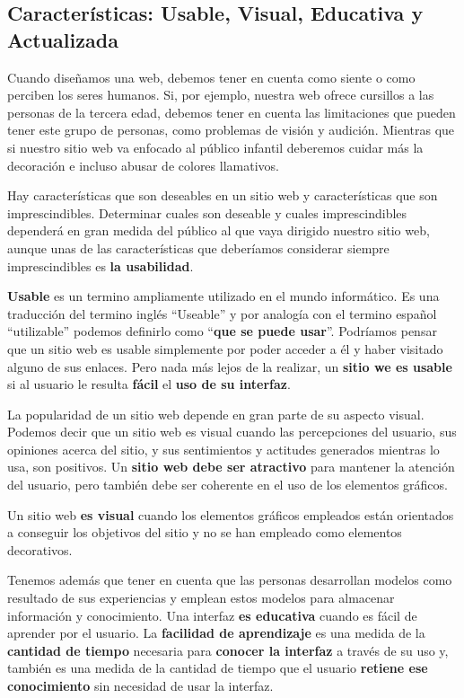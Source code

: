 \subsection{Características: Usable, Visual, Educativa y Actualizada}
Cuando diseñamos una web, debemos tener en cuenta como siente o como perciben los seres humanos. Si, por ejemplo, nuestra web ofrece cursillos a las personas de la tercera edad, debemos tener en cuenta las limitaciones que pueden tener este grupo de personas, como problemas de visión y audición. Mientras que si nuestro sitio web va enfocado al público infantil deberemos cuidar más la decoración e incluso abusar de colores llamativos.

Hay características que son deseables en un sitio web y características que son imprescindibles. Determinar cuales son deseable y cuales imprescindibles dependerá en gran medida del público al que vaya dirigido nuestro sitio web, aunque unas de las características que deberíamos considerar siempre imprescindibles es \textbf{la usabilidad}.

\textbf{Usable} es un termino ampliamente utilizado en el mundo informático. Es una traducción del termino inglés ``Useable'' y por analogía con el termino español ``utilizable'' podemos definirlo como ``\textbf{que se puede usar}''. Podríamos pensar que un sitio web es usable simplemente por poder acceder a él y haber visitado alguno de sus enlaces. Pero nada más lejos de la realizar, un \textbf{sitio we es usable} si al usuario le resulta \textbf{fácil} el \textbf{uso de su interfaz}.

La popularidad de un sitio web depende en gran parte de su aspecto visual. Podemos decir que un sitio web es visual cuando las percepciones del usuario, sus opiniones acerca del sitio, y sus sentimientos y actitudes generados mientras lo usa, son positivos. Un \textbf{sitio web debe ser atractivo} para mantener la atención del usuario, pero también debe ser coherente en el uso de los elementos gráficos.

Un sitio web \textbf{es visual} cuando los elementos gráficos empleados están orientados a conseguir los objetivos del sitio y no se han empleado como elementos decorativos.

Tenemos además que tener en cuenta que las personas desarrollan modelos como resultado de sus experiencias y emplean estos modelos para almacenar información y conocimiento. Una interfaz \textbf{es educativa} cuando es fácil de aprender por el usuario. La \textbf{facilidad de aprendizaje} es una medida de la \textbf{cantidad de tiempo} necesaria para \textbf{conocer la interfaz} a través de su uso y, también es una medida de la cantidad de tiempo que el usuario \textbf{retiene ese conocimiento} sin necesidad de usar la interfaz.

